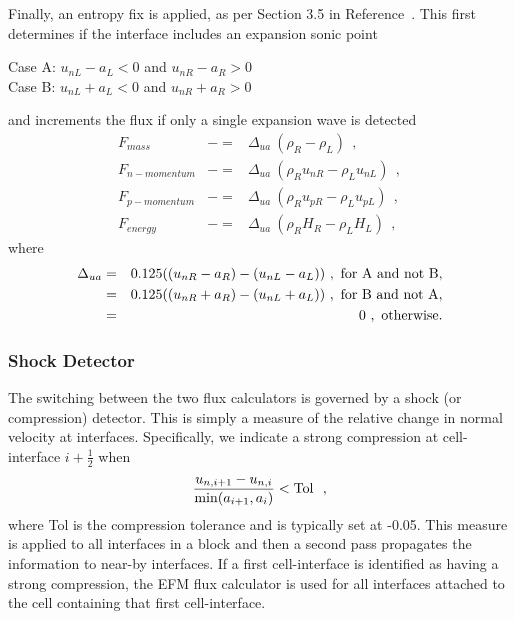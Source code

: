 \medskip
Finally, an entropy fix is applied, as per Section 3.5 in Reference~\cite{wada_liou_94a}.
This first determines if the interface includes an expansion sonic point\\
\begin{center}
 Case A: $u_{nL} - a_L < 0$ and $u_{nR} - a_R > 0$\\
 Case B: $u_{nL} + a_L < 0$ and $u_{nR} + a_R > 0$
\end{center}
and increments the flux if only a single expansion wave is detected
\newcommand{\dua}{\Delta_{ua}}
\begin{eqnarray}
 F_{mass} & -= & \dua ~ (\rho_R - \rho_L) ~~, \nonumber \\
 F_{n-momentum} & -= & \dua ~ (\rho_R u_{nR} - \rho_L u_{nL})~~, \nonumber \\
 F_{p-momentum} & -= & \dua ~ (\rho_R u_{pR} - \rho_L u_{pL})~~, \nonumber \\
 F_{energy} & -= & \dua ~ (\rho_R H_R - \rho_L H_L)~~,
\end{eqnarray}
where
\begin{eqnarray}
 \dua & = & 0.125 ((u_{nR} - a_R) - (u_{nL} - a_L)) ~,{\rm ~ for~ A~ and~ not~ B}, \nonumber \\
      & = & 0.125 ((u_{nR} + a_R) - (u_{nL} + a_L)) ~,{\rm ~ for~ B~ and~ not~ A}, \nonumber \\
      & = & 0~, {\rm ~ otherwise}.
\end{eqnarray}


\subsubsection{Shock Detector}
%
The switching between the two flux calculators is governed by a shock (or compression) detector.
This is simply a measure of the relative change in normal velocity at interfaces.
Specifically, we indicate a strong compression at cell-interface $i + \frac{1}{2}$ when
\begin{equation}
   \frac{u_{n,i+1} - u_{n,i}}{\min(a_{i+1}, a_i)} < \rm Tol ~~,
\end{equation}
where Tol is the compression tolerance and is typically set at -0.05.
This measure is applied to all interfaces in a block and then a second pass propagates the information 
to near-by interfaces.
If a first cell-interface is identified as having a strong compression, the EFM flux calculator is used 
for all interfaces attached to the cell containing that first cell-interface. 


